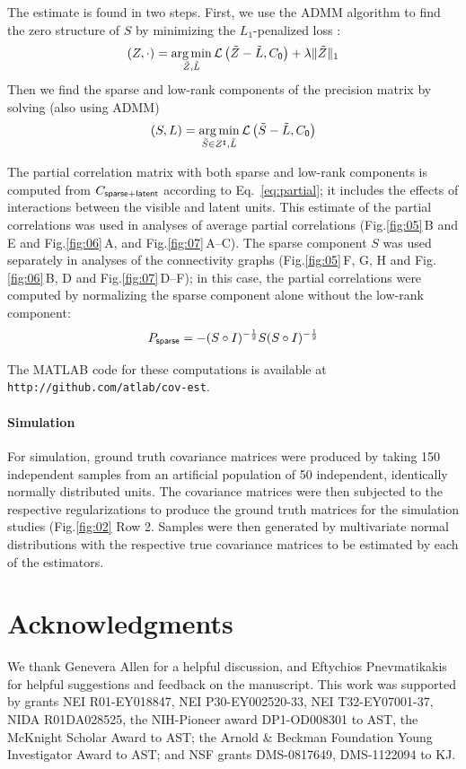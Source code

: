 \documentclass[10pt]{article}
\newcommand{\figref}[2]{Fig.\;\ref{fig:#1}\,#2}
\newcommand{\loss}[1]{\mathcal L\left(#1\right)}
\DeclareMathOperator*{\argmin}{arg\,min}
\begin{document}
The estimate is found in two steps. First, we use the ADMM algorithm to find the zero structure of $S$ by minimizing the $L_1$-penalized loss \cite{Chandrasekaran:2010,Ma:2013}:
\begin{equation}
(Z,\cdot) = \argmin\limits_{\tilde Z,\tilde L} \loss{\tilde Z-\tilde L, C_{\sf 0}} + \lambda\|\tilde Z\|_1
\end{equation}
Then we find the sparse and low-rank components of the precision matrix by solving (also using ADMM) 
\begin{equation}
(S,L) = \argmin\limits_{\tilde S \in Z^\sharp,\tilde L} \loss{\tilde S-\tilde L, C_{\sf 0} }
\end{equation}

The partial correlation matrix with both sparse and low-rank components is computed from $C_{\sf sparse+latent}$ according to Eq.~\ref{eq:partial}; it includes the effects of interactions between the visible and latent units.  This estimate of the partial correlations was used in analyses of average partial correlations (\figref{05}{B and E} and \figref{06}{A}, and \figref{07}{A--C}).  The sparse component $S$ was used separately in analyses of the connectivity graphs (\figref{05}{F, G, H} and \figref{06}{B, D} and \figref{07}{D--F}); in this case, the partial correlations were computed by normalizing the sparse component alone without the low-rank component: 
\begin{equation}
P_{\sf sparse} = -(S\circ I)^{-\frac 1 2} S  (S\circ I)^{-\frac 1 2}
\end{equation}

The MATLAB code for these computations is available at {\tt http://github.com/atlab/cov-est}.


\paragraph{Simulation}
For simulation, ground truth covariance matrices were produced by taking 150 independent samples from an artificial population of 50 independent, identically normally distributed units. The covariance matrices were then subjected to the respective regularizations to produce the ground truth matrices for the simulation studies (\figref{02}{\,Row 2}. Samples were then generated by multivariate normal distributions with the respective true covariance matrices to be estimated by each of the estimators. 

\section*{Acknowledgments}
We thank Genevera Allen for a helpful discussion, and Eftychios Pnevmatikakis for helpful suggestions and feedback on the manuscript.  This work was supported by grants NEI R01-EY018847, NEI P30-EY002520-33, NEI T32-EY07001-37, NIDA R01DA028525, the NIH-Pioneer award DP1-OD008301 to AST, the McKnight Scholar Award to AST; the Arnold \& Beckman Foundation Young Investigator Award to AST; and NSF grants DMS-0817649, DMS-1122094 to KJ.

\end{document}
